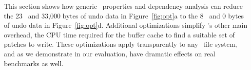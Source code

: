 This section shows how generic \patch\
properties and dependency analysis can reduce the 23 \patches\ and 33,000 bytes
of undo data in Figure~\ref{fig:opt}a to the 8 \patches\ and 0 bytes of
undo data in Figure~\ref{fig:opt}d.
%
Additional optimizations simplify \Kudos's other main overhead, the CPU
time required for the buffer cache to find a suitable set of patches to
write.
%
These optimizations apply transparently to any \Kudos\ file system, and as
we demonstrate in our evaluation, have dramatic effects on real benchmarks
as well.

\begin{comment}

Challenges in a \patch-based file system implementation include:

\textbf{Buffer cache graph traversal.}
%
In order to evict and write a block, the buffer cache must choose a block
$b$,
%
and then find a set of \patches\ $P_b \subseteq \PMem[b]$ whose dependencies
satisfy a graph property, namely that $\PDepset{P_b} \subseteq P_b \cup
\PDisk$.
%
It usually makes sense to define $P_b$ maximally---that is, as the
\emph{largest} corresponding set of \patches.
%
In the ideal (and common) case $P_b = \PMem[b]$, which lets the cache reuse
$b$'s memory once $P_b$ is committed to disk.  However, in some cases there
may be no block for which $P_b = \PMem[b]$.
%
It would also be nice if the blocks chosen for writing also maximized the
disk's commit rate, by minimizing seeks and so forth.

A naive implementation might calculate, for each in-memory block $b$, the
largest set of \patches\ $P_b \subseteq \PMem[b]$ with $\PDepset{P_b}
\subseteq P_b \cup \PDisk$, then evict some block close to previously
written blocks and with few reverted \patches\ (where $\PMem[b] - P_b$
is small).
%
This, however, would be extraordinarily expensive.
%
Finding $P_b$ requires traversing a dependency graph which might contain
thousands and thousands of nodes.
%
Doing so for each block, once per eviction, would take huge amounts of CPU
time.


\textbf{Undo memory usage.}
%
Only a small fraction of \patches\ will ever need to be reverted.
%
For example, most data writes never need to be reverted in any file
system.
%
If a \patch\ won't be reverted under any circumstances, the memory and
CPU time spent to preserve the old version is wasted.


\textbf{\Patch\ memory usage.}
%
\Patches\ themselves take up memory and require time to allocate, free, and
traverse.
%
If two \patches\ have redundant dependencies, it would be faster to combine
them.




The next section tackles all of these challenges.
\end{comment}


